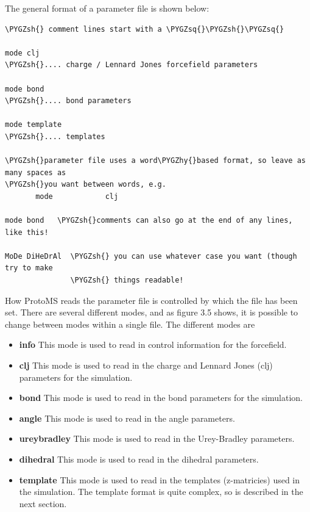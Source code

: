 \documentclass[letterpaper,10pt,english]{sphinxmanual}
\def\PYGZsh{\char`\#}
\def\PYGZhy{\char`\-}
\def\PYGZsq{\char`\'}
\begin{document}
The general format of a parameter file is shown below:

\begin{Verbatim}[commandchars=\\\{\}]
\PYGZsh{} comment lines start with a \PYGZsq{}\PYGZsh{}\PYGZsq{}

mode clj
\PYGZsh{}.... charge / Lennard Jones forcefield parameters

mode bond
\PYGZsh{}.... bond parameters

mode template
\PYGZsh{}.... templates

\PYGZsh{}parameter file uses a word\PYGZhy{}based format, so leave as many spaces as
\PYGZsh{}you want between words, e.g.
       mode            clj

mode bond   \PYGZsh{}comments can also go at the end of any lines, like this!

MoDe DiHeDrAl  \PYGZsh{} you can use whatever case you want (though try to make
               \PYGZsh{} things readable!
\end{Verbatim}

How ProtoMS reads the parameter file is controlled by which  the file has been set. There are several different modes, and as figure 3.5 shows, it is possible to change between modes within a single file. The different modes are
\begin{itemize}
\item {} 
\textbf{info} This mode is used to read in control information for the forcefield.

\item {} 
\textbf{clj} This mode is used to read in the charge and Lennard Jones (clj) parameters for the simulation.

\item {} 
\textbf{bond} This mode is used to read in the bond parameters for the simulation.

\item {} 
\textbf{angle} This mode is used to read in the angle parameters.

\item {} 
\textbf{ureybradley} This mode is used to read in the Urey-Bradley parameters.

\item {} 
\textbf{dihedral} This mode is used to read in the dihedral parameters.

\item {} 
\textbf{template} This mode is used to read in the templates (z-matricies) used in the simulation. The template format is quite complex, so is described in the next section.

\end{itemize}
\end{document}
